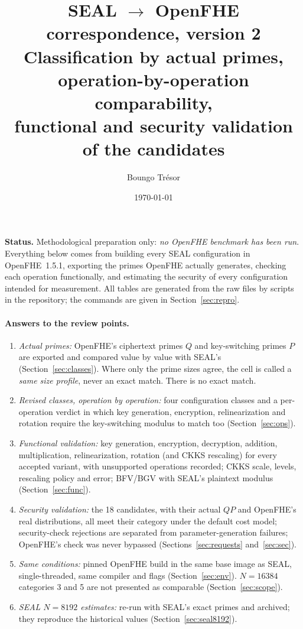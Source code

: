 \documentclass[11pt]{article}
\title{SEAL $\to$ OpenFHE correspondence, version 2\\[2pt]
\large Classification by actual primes, operation-by-operation comparability,\\ functional and security validation of the candidates}
\author{Boungo Tr\'esor}
\date{\today}
\begin{document}
\maketitle

\noindent\textbf{Status.} Methodological preparation only: \emph{no OpenFHE benchmark has been run}. Everything below comes from building every SEAL configuration in OpenFHE~1.5.1, exporting the primes OpenFHE actually generates, checking each operation functionally, and estimating the security of every configuration intended for measurement. All tables are generated from the raw files by scripts in the repository; the commands are given in Section~\ref{sec:repro}.

\paragraph{Answers to the review points.}
\begin{enumerate}[leftmargin=*, itemsep=1pt]
  \item \emph{Actual primes:} OpenFHE's ciphertext primes $Q$ and key-switching primes $P$ are exported and compared value by value with SEAL's (Section~\ref{sec:classes}). Where only the prime sizes agree, the cell is called a \emph{same size profile}, never an exact match. There is no exact match.
  \item \emph{Revised classes, operation by operation:} four configuration classes and a per-operation verdict in which key generation, encryption, relinearization and rotation require the key-switching modulus to match too (Section~\ref{sec:ops}).
  \item \emph{Functional validation:} key generation, encryption, decryption, addition, multiplication, relinearization, rotation (and CKKS rescaling) for every accepted variant, with unsupported operations recorded; CKKS scale, levels, rescaling policy and error; BFV/BGV with SEAL's plaintext modulus (Section~\ref{sec:func}).
  \item \emph{Security validation:} the 18 candidates, with their actual $QP$ and OpenFHE's real distributions, all meet their category under the default cost model; security-check rejections are separated from parameter-generation failures; OpenFHE's check was never bypassed (Sections~\ref{sec:requests} and~\ref{sec:sec}).
  \item \emph{Same conditions:} pinned OpenFHE build in the same base image as SEAL, single-threaded, same compiler and flags (Section~\ref{sec:env}). $N{=}16384$ categories 3 and 5 are not presented as comparable (Section~\ref{sec:scope}).
  \item \emph{SEAL $N{=}8192$ estimates:} re-run with SEAL's exact primes and archived; they reproduce the historical values (Section~\ref{sec:seal8192}).
\end{enumerate}
\end{document}
